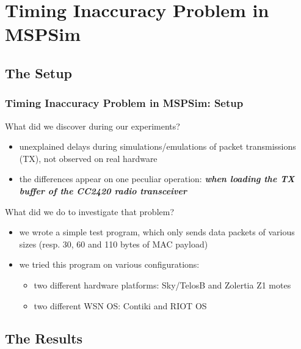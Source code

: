 \documentclass[10pt,c]{beamer}
\renewcommand{\emph}[1]{\textbf{\textit{#1}}}
\begin{document}

\section{Timing Inaccuracy Problem in MSPSim}

\subsection{The Setup}

\begin{frame}
\frametitle{Timing Inaccuracy Problem in MSPSim: Setup}
\begin{alertblock}{What did we discover during our experiments?}
\begin{itemize}
\item unexplained delays during simulations/emulations of packet
transmissions (TX), not observed on real hardware
\item the differences appear on one peculiar operation: \emph{when loading
the TX buffer of the CC2420 radio transceiver}
\end{itemize}
\end{alertblock}
\begin{block}{What did we do to investigate that problem?}
\begin{itemize}
\item we wrote a simple test program, which only sends data packets of
various sizes (resp. 30, 60 and 110 bytes of MAC payload)
\item we tried this program on various configurations:
  \begin{itemize}
  \item two different hardware platforms: Sky/TelosB and Zolertia Z1 motes
  \item two different WSN OS: Contiki and RIOT OS
  \end{itemize}
\end{itemize}
\end{block}
\end{frame}

\subsection{The Results}
\end{document}

